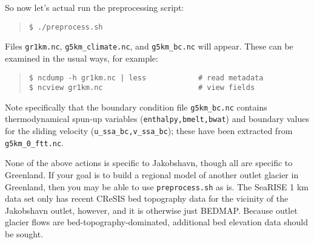 So now let's actual run the preprocessing script:
\begin{quote}\small
\begin{verbatim}
$ ./preprocess.sh
\end{verbatim}
\normalsize\end{quote}
Files \texttt{gr1km.nc}, \texttt{g5km_climate.nc}, and \texttt{g5km_bc.nc} will appear.  These can be examined in the usual ways, for example:
\begin{quote}\small
\begin{verbatim}
$ ncdump -h gr1km.nc | less            # read metadata
$ ncview gr1km.nc                      # view fields
\end{verbatim}
\normalsize\end{quote}
Note specifically that the boundary condition file \texttt{g5km_bc.nc} contains thermodynamical spun-up variables (\texttt{enthalpy,bmelt,bwat}) and boundary values for the sliding velocity (\texttt{u_ssa_bc,v_ssa_bc}); these have been extracted from \texttt{g5km_0_ftt.nc}.

None of the above actions is specific to Jakobshavn, though all are specific to Greenland.  If your goal is to build a regional model of another outlet glacier in Greenland, then you may be able to use \texttt{preprocess.sh} as is.  The SeaRISE 1 km data set only has recent CReSIS bed topography data for the vicinity of the Jakobshavn outlet, however, and it is otherwise just BEDMAP.  Because outlet glacier flows are bed-topography-dominated, additional bed elevation data should be sought.

